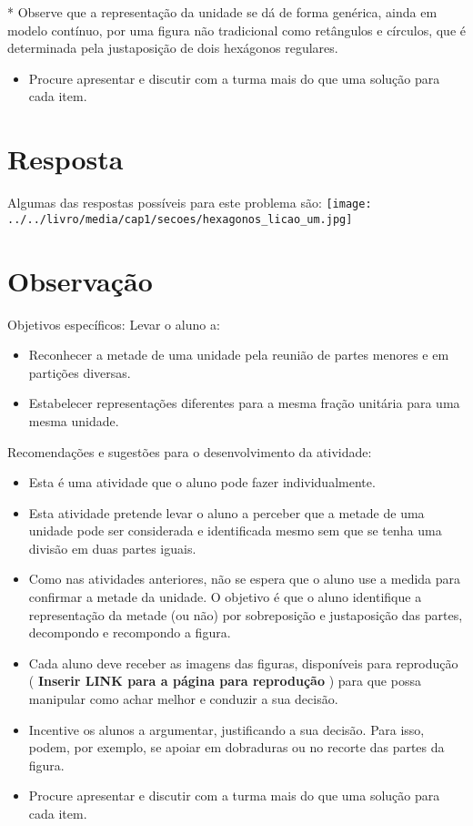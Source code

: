 \documentclass{book}
\begin{document}
  * Observe que a representação da unidade se dá de forma genérica, ainda em modelo contínuo, por uma figura não tradicional como retângulos e círculos, que é determinada pela justaposição de dois hexágonos regulares.  
\begin{itemize} %
    \item       Procure apresentar e discutir com a turma mais do que uma solução para cada item.
\end{itemize} %
  



\section{Resposta}  
  
  Algumas das respostas possíveis para este problema são:  
    \texttt{[image: ../../livro/media/cap1/secoes/hexagonos\_licao\_um.jpg]}  
  



\section{Observação}  
  Objetivos específicos: Levar o aluno a:  
\begin{itemize} %
    \item       Reconhecer a metade de uma unidade pela reunião de partes menores e em partições diversas. 
    \item       Estabelecer representações diferentes para a mesma fração unitária para uma mesma unidade.
\end{itemize} %
  
  
  Recomendações e sugestões para o desenvolvimento da atividade:  
\begin{itemize} %
    \item       Esta é uma atividade que o aluno pode fazer individualmente.
    \item       Esta atividade pretende levar o aluno a perceber que a metade de uma unidade pode ser considerada e identificada mesmo sem que se tenha uma divisão em duas partes iguais. 
    \item       Como nas atividades anteriores, não se espera que o aluno use a medida para confirmar a metade da unidade. O objetivo é que o aluno identifique a representação da metade (ou não) por sobreposição e justaposição das partes, decompondo e recompondo a figura.
    \item       Cada aluno deve receber as imagens das figuras, disponíveis para reprodução (      {\bf Inserir LINK para a página para reprodução}      ) para que possa manipular como achar melhor e conduzir a sua decisão. 
    \item       Incentive os alunos a argumentar, justificando a sua decisão. Para isso, podem, por exemplo, se apoiar em dobraduras ou no recorte das partes da figura.
    \item       Procure apresentar e discutir com a turma mais do que uma solução para cada item.   
\end{itemize} %
  
\end{document}
